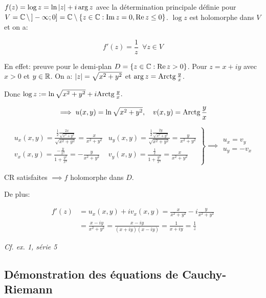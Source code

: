 \begin{example}[4]\hfill
    
    $f(z) = \log z = \ln \left|z\right| + i \arg z$ avec la détermination principale définie pour $V = \mathbb{C}\, \setminus\, ]-\infty; 0] = \mathbb{C} \setminus \{z \in \mathbb{C} : \operatorname{Im} z = 0, \operatorname{Re} z \leq 0\}$.
    $\log z$ est holomorphe dans $V$ et on a:
    
    \[f'(z) = \frac{1}{z} \enspace \forall z \in V\]
    
    En effet: preuve pour le demi-plan $D = \{z \in \mathbb{C} : \operatorname{Re} z > 0\}$.
    Pour $z = x +iy$ avec $x > 0$ et $y \in \mathbb{R}$.
    On a: $\left|z\right| = \sqrt{x^2 + y^2}$ et $\arg z = \textrm{Arctg}\, \frac{y}{x}$.
    
    Donc $\log z := \ln \sqrt{x^2 + y^2} + i \textrm{Arctg}\, \frac{y}{x}.$
    
    \[\implies u(x,y) = \ln \sqrt{x^2 + y^2}, \quad v(x,y) = \textrm{Arctg}\, \frac{y}{x}\]
    
    \[\left.
    \begin{array}{ll}
    u_x(x,y) = \frac{\frac{1}{2}\frac{2x}{\sqrt{x^2 + y^2}}}{\sqrt{x^2 + y^2}}
    = \frac{x}{x^2 + y^2} &
    u_y(x,y) = \frac{\frac{1}{2}\frac{2y}{\sqrt{x^2 + y^2}}}{\sqrt{x^2 + y^2}}
    = \frac{y}{x^2 + y^2} \\
    v_x(x,y) = \frac{-\frac{y}{x^2}}{1 + \frac{y^2}{x^2}}
    = - \frac{y}{x^2 + y^2} &
    v_y(x,y) = \frac{\frac{1}{x}}{1 + \frac{y^2}{x^2}}
    =  \frac{x}{x^2 + y^2}
    \end{array}
    \right\} \implies
    \begin{array}{l}
    u_x = v_y \\
    u_y = -v_x
    \end{array}\]
    
    CR satisfaites $\implies f$ holomorphe dans $D$.
    
    De plus:
    
    \begin{align*}
    f'(z) &= u_x(x,y) + i v_x(x,y) = \frac{x}{x^2 + y^2} - i \frac{y}{x^2 + y^2}
    \\&=
    \frac{x - iy}{x^2 + y^2} = \frac{x - iy}{(x + iy)(x - iy)} = \frac{1}{x + iy} = \frac{1}{z}
    \end{align*}
\end{example}

\textit{Cf. ex. 1, série 5}

\subsection{Démonstration des équations de Cauchy-Riemann}

